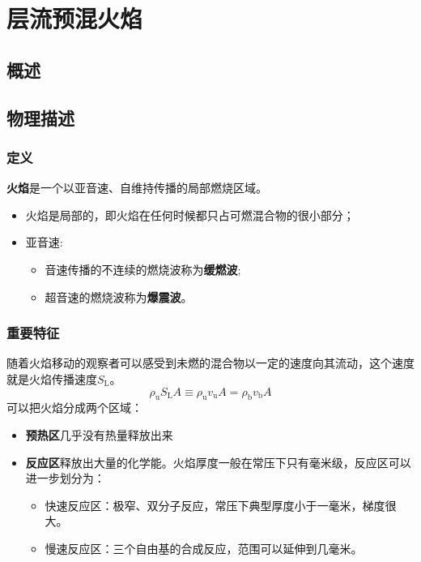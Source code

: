 
\section{层流预混火焰}
\subsection{概述}
\subsection{物理描述}
\subsubsection{定义}
\textbf{火焰}是一个以亚音速、自维持传播的局部燃烧区域。
\begin{itemize}
    \item 火焰是局部的，即火焰在任何时候都只占可燃混合物的很小部分；
    \item 亚音速:
    \begin{itemize}
        \item 音速传播的不连续的燃烧波称为\textbf{缓燃波};
        \item 超音速的燃烧波称为\textbf{爆震波}。
    \end{itemize}
\end{itemize}

\subsubsection{重要特征}
随着火焰移动的观察者可以感受到未燃的混合物以一定的速度向其流动，这个速度就是火焰传播速度\(S_\mathrm{L}\)。
\begin{equation}
    \rho_\mathrm{u} S_\mathrm{L} A \equiv \rho_\mathrm{u} v_\mathrm{u}A = \rho_\mathrm{b} v_\mathrm{b}A
\end{equation}
可以把火焰分成两个区域：
\begin{itemize}
    \item \textbf{预热区}几乎没有热量释放出来
    \item \textbf{反应区}释放出大量的化学能。火焰厚度一般在常压下只有毫米级，反应区可以进一步划分为：
    \begin{itemize}
        \item 快速反应区：极窄、双分子反应，常压下典型厚度小于一毫米，梯度很大。
        \item 慢速反应区：三个自由基的合成反应，范围可以延伸到几毫米。
    \end{itemize}
\end{itemize}

